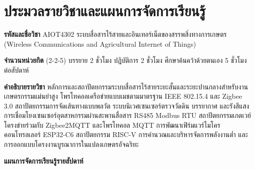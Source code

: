 \chapter*{ประมวลรายวิชาและแผนการจัดการเรียนรู้}

\noindent\textbf{รหัสและชื่อวิชา} \quad AIOT4302 ระบบสื่อสารไร้สายและอินเทอร์เน็ตของสรรพสิ่งทางการเกษตร\\
(Wireless Communications and Agricultural Internet of Things)

\noindent\textbf{จำนวนหน่วยกิต} (2-2-5) บรรยาย 2 ชั่วโมง ปฏิบัติการ 2 ชั่วโมง ศึกษาค้นคว้าด้วยตนเอง 5 ชั่วโมงต่อสัปดาห์

\noindent\textbf{คำอธิบายรายวิชา} \quad หลักการและสถาปัตยกรรมระบบสื่อสารไร้สายระยะสั้นและระยะปานกลางสำหรับงานเกษตรกรรมแม่นยำสูง โพรโทคอลเครือข่ายแบบเมชตามมาตรฐาน IEEE 802.15.4 และ Zigbee 3.0 สถาปัตยกรรมการจัดเส้นทางแบบพลวัต ระบบนิเวศเซนเซอร์ตรวจวัดดิน บรรยากาศ และรังสีแสง การเชื่อมโยงเซนเซอร์อุตสาหกรรมผ่านสะพานสื่อสาร RS485 Modbus RTU สถาปัตยกรรมเกตเวย์โครงข่ายร่วมกับ Zigbee2MQTT และโพรโทคอล MQTT การพัฒนาเฟิร์มแวร์ไมโครคอนโทรลเลอร์ ESP32-C6 สถาปัตยกรรม RISC-V การคำนวณและบริหารจัดการพลังงานต่ำ และการออกแบบโครงงานบูรณาการในแปลงเกษตรอัจฉริยะ

\vspace{0.4cm}
\noindent\textbf{แผนการจัดการเรียนรู้รายสัปดาห์}

